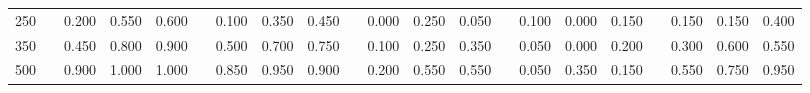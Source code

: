 % 
\begin{tabular}{ccccccccccccccccccccc}
  \hline
  \hline
250 &  & 0.200 & 0.550 & 0.600 &  & 0.100 & 0.350 & 0.450 &  & 0.000 & 0.250 & 0.050 &  & 0.100 & 0.000 & 0.150 &  & 0.150 & 0.150 & 0.400 \\ 
  350 &  & 0.450 & 0.800 & 0.900 &  & 0.500 & 0.700 & 0.750 &  & 0.100 & 0.250 & 0.350 &  & 0.050 & 0.000 & 0.200 &  & 0.300 & 0.600 & 0.550 \\ 
  500 &  & 0.900 & 1.000 & 1.000 &  & 0.850 & 0.950 & 0.900 &  & 0.200 & 0.550 & 0.550 &  & 0.050 & 0.350 & 0.150 &  & 0.550 & 0.750 & 0.950 \\ 
   \hline
\end{tabular}
